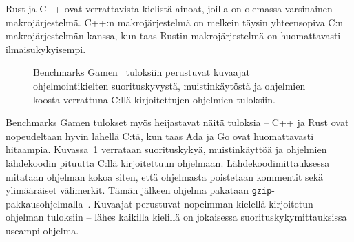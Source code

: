 Rust ja C++ ovat verrattavista kielistä ainoat, joilla on olemassa varsinainen
makrojärjestelmä. C++:n makrojärjestelmä on melkein täysin yhteensopiva C:n
makrojärjestelmän kanssa, kun taas Rustin makrojärjestelmä on huomattavasti
ilmaisukykyisempi.

\newpage

\begin{figure}[ht!]
    \begin{adjustbox}{center}
    \begin{minipage}{1.15\textwidth}
    \begin{minipage}{0.5\textwidth}
        
        \vspace*{-0.8cm}
    \end{minipage}
    \begin{minipage}{0.5\textwidth}
        
        \vspace*{-0.9cm}
    \end{minipage}
    \end{minipage}
    \end{adjustbox}
    \begin{adjustbox}{center}
    \begin{minipage}{1.15\textwidth}
    \end{minipage}
    \end{adjustbox}
    \caption{
        Benchmarks Gamen~\citep[tiedot haettu 1.1.2019]{benchmarks} tuloksiin
        perustuvat kuvaajat ohjelmointikielten suorituskyvystä, muistinkäytöstä
        ja ohjelmien koosta verrattuna C:llä kirjoitettujen ohjelmien
        tuloksiin.}
    \label{fig:benchmarksgame}
\end{figure}

\FloatBarrier

Benchmarks Gamen tulokset myös heijastavat näitä tuloksia -- C++ ja Rust ovat
nopeudeltaan hyvin lähellä C:tä, kun taas Ada ja Go ovat huomattavasti
hitaampia. Kuvassa~\ref{fig:benchmarksgame} verrataan suorituskykyä,
muistinkäyttöä ja ohjelmien lähdekoodin pituutta C:llä kirjoitettuun ohjelmaan.
Lähdekoodimittauksessa mitataan ohjelman kokoa siten, että ohjelmasta
poistetaan kommentit sekä ylimääräiset välimerkit. Tämän jälkeen ohjelma
pakataan \texttt{gzip}-pakkausohjelmalla~\citep{howmeasured}. Kuvaajat
perustuvat nopeimman kielellä kirjoitetun ohjelman tuloksiin -- lähes kaikilla
kielillä on jokaisessa suorituskykymittauksissa useampi ohjelma.

